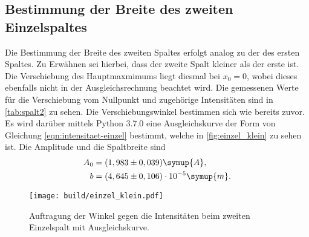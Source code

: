 \subsection{Bestimmung der Breite des zweiten Einzelspaltes}
    Die Bestimmung der Breite des zweiten Spaltes erfolgt analog zu der des ersten Spaltes. Zu Erwähnen sei hierbei, dass der zweite Spalt kleiner 
    als der erste ist. Die Verschiebung des Hauptmaxmimums liegt diesmal bei $x_0 = 0$, wobei dieses ebenfalls nicht in der Ausgleichsrechnung
    beachtet wird. Die gemessenen Werte für die Verschiebung vom Nullpunkt und zugehörige Intensitäten sind 
    in \autoref{tab:spalt2} zu sehen. Die Verschiebungswinkel bestimmen sich wie bereits zuvor.
    Es wird darüber mittels Python 3.7.0 eine Ausgleichskurve der Form von Gleichung 
    \eqref{eqn:intensitaet-einzel} bestimmt, welche in \autoref{fig:einzel_klein} zu sehen ist. Die Amplitude und die Spaltbreite sind 
    \begin{align}
        A_0 &= (1,983 \pm 0,039) \symup{A}, \\
        b &= (4,645\pm 0,106) \cdot 10^{-5} \symup{m}. 
    \end{align}
    
    \begin{figure}
        \centering
        \texttt{[image: build/einzel\_klein.pdf]}
        \caption{Auftragung der Winkel gegen die Intensitäten beim zweiten Einzelspalt mit Ausgleichskurve.}
        \label{fig:einzel_klein}
    \end{figure}

